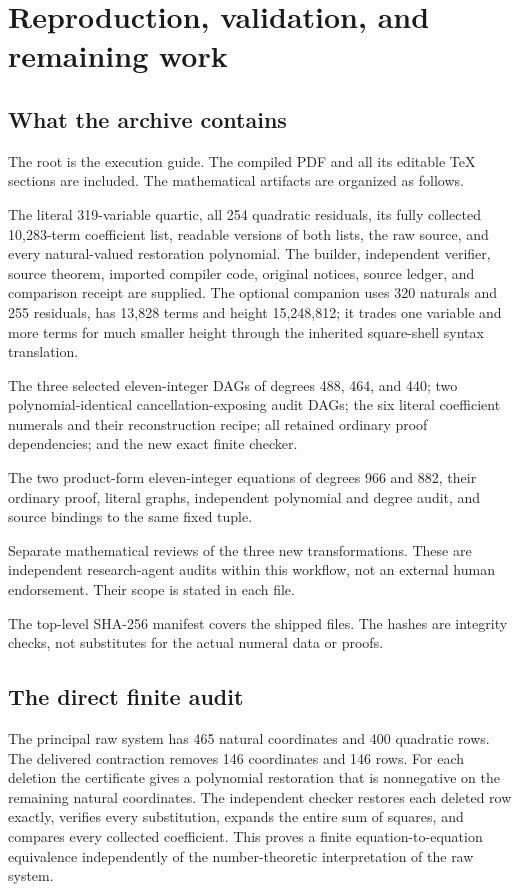 \section{Reproduction, validation, and remaining work}
\label{sec:validation}

\subsection{What the archive contains}
The root  is the execution guide. The compiled PDF and
all its editable TeX sections are included. The mathematical artifacts
are organized as follows.
\begin{description}[style=nextline]
\item[\code{direct/}]
The literal 319-variable quartic, all 254 quadratic residuals, its fully
collected 10,283-term coefficient list, readable versions of both lists,
the raw source, and every natural-valued restoration polynomial. The
builder, independent verifier, source theorem, imported compiler code,
original notices, source ledger, and comparison receipt are supplied.
The optional  companion uses 320 naturals and 255
residuals, has 13,828 terms and height 15,248,812; it trades one variable
and more terms for much smaller height through the inherited square-shell
syntax translation.
\item[\code{norm/}]
The three selected eleven-integer DAGs of degrees 488, 464, and 440;
two polynomial-identical cancellation-exposing audit DAGs; the six
literal coefficient numerals and their reconstruction recipe; all
retained ordinary proof dependencies; and the new exact finite checker.
\item[\code{lowops/}]
The two product-form eleven-integer equations of degrees 966 and 882,
their ordinary proof, literal graphs, independent polynomial and degree
audit, and source bindings to the same fixed tuple.
\item[\code{reviews/}]
Separate mathematical reviews of the three new transformations. These
are independent research-agent audits within this workflow, not an
external human endorsement. Their scope is stated in each file.
\end{description}
The top-level SHA-256 manifest covers the shipped files. The hashes are
integrity checks, not substitutes for the actual numeral data or proofs.

\subsection{The direct finite audit}
The principal raw system has 465 natural coordinates and 400 quadratic
rows. The delivered contraction removes 146 coordinates and 146 rows.
For each deletion the certificate gives a polynomial restoration that is
nonnegative on the remaining natural coordinates. The independent checker
restores each deleted row exactly, verifies every substitution, expands
the entire sum of squares, and compares every collected coefficient.
This proves a finite equation-to-equation equivalence independently of
the number-theoretic interpretation of the raw system.

